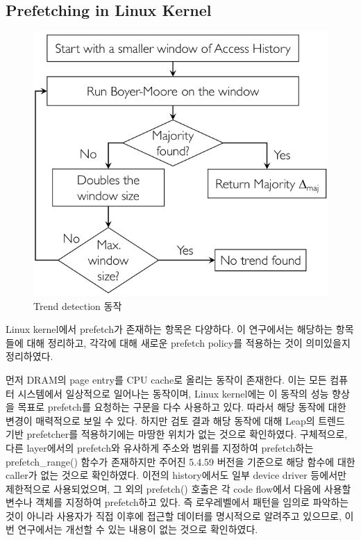 \documentclass[conference,11pt]{IEEEtran}
\begin{document}
\begin{CJK}{UTF8}{}
    \subsection{Prefetching in Linux Kernel}

    \begin{figure}[t]
        \centerline{\includegraphics[width=\linewidth]{leap2.png}}
        \caption{Trend detection 동작}
        \label{fig:leap2}
    \end{figure}

    Linux kernel에서 prefetch가 존재하는 항목은 다양하다. 이 연구에서는 해당하는 항목들에 대해 정리하고, 각각에 대해 새로운 prefetch policy를 적용하는 것이 의미있을지 정리하였다.

    먼저 DRAM의 page entry를 CPU cache로 올리는 동작이 존재한다. 이는 모든 컴퓨터 시스템에서 일상적으로 일어나는 동작이며, Linux kernel에는 이 동작의 성능 향상을 목표로 prefetch를 요청하는 구문을 다수 사용하고 있다. 따라서 해당 동작에 대한 변경이 매력적으로 보일 수 있다. 하지만 검토 결과 해당 동작에 대해 Leap의 트렌드 기반 prefetcher를 적용하기에는 마땅한 위치가 없는 것으로 확인하였다. 구체적으로, 다른 layer에서의 prefetch와 유사하게 주소와 범위를 지정하여 prefetch하는 prefetch\_range() 함수가 존재하지만 주어진 5.4.59 버전을 기준으로 해당 함수에 대한 caller가 없는 것으로 확인하였다. 이전의 history에서도 일부 device driver 등에서만 제한적으로 사용되었으며, 그 외의 prefetch() 호출은 각 code flow에서 다음에 사용할 변수나 객체를 지정하여 prefetch하고 있다. 즉 로우레벨에서 패턴을 임의로 파악하는 것이 아니라 사용자가 직접 이후에 접근할 데이터를 명시적으로 알려주고 있으므로, 이번 연구에서는 개선할 수 있는 내용이 없는 것으로 확인하였다.


\end{CJK}
\end{document}
